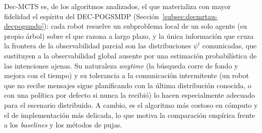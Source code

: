 
Dec-MCTS es, de los algoritmos analizados, el que materializa con mayor fidelidad el espíritu del DEC-POGSMDP (Sección~\ref{subsec:decmrtau-decpogsmdp}): cada robot resuelve un subproblema local de un solo agente (su propio árbol) sobre el que razona a largo plazo, y la única información que cruza la frontera de la observabilidad parcial son las distribuciones $\psi^{i}$ comunicadas, que sustituyen a la observabilidad global ausente por una estimación probabilística de las intenciones ajenas. Su naturaleza \emph{anytime} (la búsqueda corre de fondo y mejora con el tiempo) y su tolerancia a la comunicación intermitente (un robot que no recibe mensajes sigue planificando con la última distribución conocida, o con una política por defecto si nunca la recibió) lo hacen especialmente adecuado para el escenario distribuido. A cambio, es el algoritmo más costoso en cómputo y el de implementación más delicada, lo que motiva la comparación empírica frente a los \textit{baselines} y los métodos de pujas.